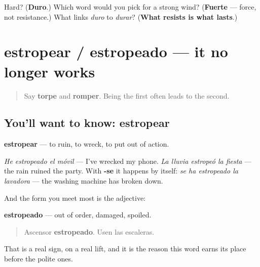 \begin{tcolorbox}[breakable,colback=teal!4,colframe=teal!35!black,title={Before you move on}]
Hard? (\textbf{Duro}.) Which word would you pick for a strong wind? (\textbf{Fuerte} — force, not resistance.) What links \emph{duro} to \emph{durar}? (\textbf{What resists is what lasts}.)
\end{tcolorbox}
\section[estropear / estropeado]{estropear / estropeado — it no longer works}

\label{lesson:ES-C448-estropear}



\begin{quote}
Say \textbf{torpe} and \textbf{romper}. Being the first often leads to the second.
\end{quote}

\subsection*{You'll want to know: estropear}
\textbf{estropear} — to ruin, to wreck, to put out of action.

\emph{He estropeado el móvil} — I've wrecked my phone. \emph{La lluvia estropeó la fiesta} — the rain ruined the party. With \textbf{-se} it happens by itself: \emph{se ha estropeado la lavadora} — the washing machine has broken down.

And the form you meet most is the adjective:

\textbf{estropeado} — out of order, damaged, spoiled.

\begin{quote}
Ascensor \textbf{estropeado}. Usen las escaleras.
\end{quote}

That is a real sign, on a real lift, and it is the reason this word earns its place before the polite ones.

